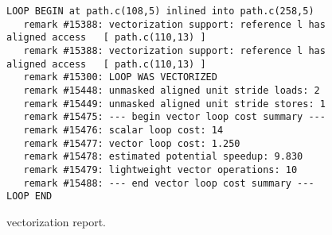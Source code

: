 \begin{figure}[h]
\centering
{
\scriptsize
\begin{BVerbatim}
LOOP BEGIN at path.c(108,5) inlined into path.c(258,5)
   remark #15388: vectorization support: reference l has aligned access   [ path.c(110,13) ]
   remark #15388: vectorization support: reference l has aligned access   [ path.c(110,13) ]
   remark #15300: LOOP WAS VECTORIZED
   remark #15448: unmasked aligned unit stride loads: 2
   remark #15449: unmasked aligned unit stride stores: 1
   remark #15475: --- begin vector loop cost summary ---
   remark #15476: scalar loop cost: 14
   remark #15477: vector loop cost: 1.250
   remark #15478: estimated potential speedup: 9.830
   remark #15479: lightweight vector operations: 10
   remark #15488: --- end vector loop cost summary ---
LOOP END
\end{BVerbatim}
}
\caption{\icc{} vectorization report.}
\label{fig:icc-vec-report}
\end{figure}
